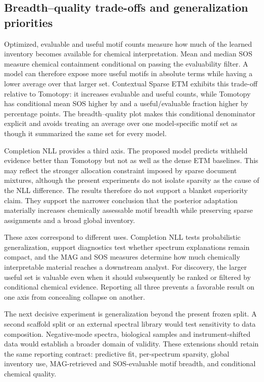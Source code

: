 \documentclass[10pt,a4paper]{article}
\begin{document}
\subsection{Breadth--quality trade-offs and generalization priorities}

Optimized, evaluable and useful motif counts measure how much of the learned
inventory becomes available for chemical interpretation. Mean and median SOS
measure chemical containment conditional on passing the evaluability filter.
A model can therefore expose more useful motifs in absolute terms while having
a lower average over that larger set. Contextual Sparse ETM exhibits this
trade-off relative to Tomotopy: it increases evaluable and useful counts, while
Tomotopy has conditional mean SOS higher by
\ContextualMeanSOSDifferenceVsTomotopy{} and a useful/evaluable fraction higher
by \ContextualUsefulRateDifferenceVsTomotopy{} percentage points. The
breadth--quality plot makes this conditional denominator explicit and avoids
treating an average over one model-specific motif set as though it summarized
the same set for every model.

Completion NLL provides a third axis. The proposed model predicts withheld
evidence better than Tomotopy but not as well as the dense ETM baselines. This
may reflect the stronger allocation constraint imposed by sparse document
mixtures, although the present experiments do not isolate sparsity as the cause
of the NLL difference. The results therefore do not support a blanket
superiority claim. They support the narrower conclusion that the posterior
adaptation materially increases chemically assessable motif breadth while
preserving sparse assignments and a broad global inventory.

These axes correspond to different uses. Completion NLL tests probabilistic
generalization, support diagnostics test whether spectrum explanations remain
compact, and the MAG and SOS measures determine how much chemically interpretable
material reaches a downstream analyst. For discovery, the larger useful set is
valuable even when it should subsequently be ranked or filtered by conditional
chemical evidence. Reporting all three prevents a favorable result on one axis
from concealing collapse on another.

The next decisive experiment is generalization beyond the present frozen split.
A second scaffold split or an external spectral library would test sensitivity
to data composition. Negative-mode spectra, biological samples and
instrument-shifted data would establish a broader domain of validity. These extensions should
retain the same reporting contract: predictive fit, per-spectrum sparsity,
global inventory use, MAG-retrieved and SOS-evaluable motif breadth, and
conditional chemical quality.
\end{document}

